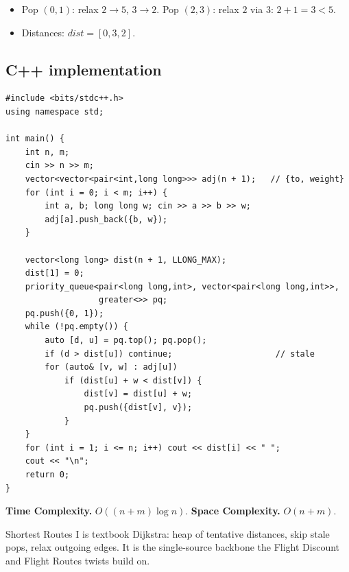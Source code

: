 
\begin{itemize}
  \item Pop $(0,1)$: relax $2\to5$, $3\to2$. Pop $(2,3)$: relax $2$ via
        $3$: $2+1=3<5$.
  \item Distances: $\textit{dist}=[0,3,2]$.
\end{itemize}

\subsection*{C++ implementation}

\begin{lstlisting}
#include <bits/stdc++.h>
using namespace std;

int main() {
    int n, m;
    cin >> n >> m;
    vector<vector<pair<int,long long>>> adj(n + 1);   // {to, weight}
    for (int i = 0; i < m; i++) {
        int a, b; long long w; cin >> a >> b >> w;
        adj[a].push_back({b, w});
    }

    vector<long long> dist(n + 1, LLONG_MAX);
    dist[1] = 0;
    priority_queue<pair<long long,int>, vector<pair<long long,int>>,
                   greater<>> pq;
    pq.push({0, 1});
    while (!pq.empty()) {
        auto [d, u] = pq.top(); pq.pop();
        if (d > dist[u]) continue;                     // stale
        for (auto& [v, w] : adj[u])
            if (dist[u] + w < dist[v]) {
                dist[v] = dist[u] + w;
                pq.push({dist[v], v});
            }
    }
    for (int i = 1; i <= n; i++) cout << dist[i] << " ";
    cout << "\n";
    return 0;
}
\end{lstlisting}

\begin{complexitybox}
\textbf{Time Complexity.} $O((n+m)\log n)$. \textbf{Space Complexity.}
$O(n+m)$.
\end{complexitybox}

\begin{takeawaybox}
Shortest Routes I is textbook Dijkstra: heap of tentative distances, skip
stale pops, relax outgoing edges. It is the single-source backbone the
Flight Discount and Flight Routes twists build on.
\end{takeawaybox}
